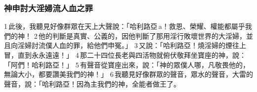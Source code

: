 \subsubsection{神申討大淫婦流人血之罪}

1 此後，我聽見好像群眾在天上大聲說：「哈利路亞 a！救恩、榮耀、權能都屬乎我們的神！ 2 他的判斷是真實、公義的，因他判斷了那用淫行敗壞世界的大淫婦，並且向淫婦討流僕人血的罪，給他們申冤。」 3 又說：「哈利路亞！燒淫婦的煙往上冒，直到永永遠遠！」 4 那二十四位長老與四活物就俯伏敬拜坐寶座的神，說：「阿們！哈利路亞！」 5 有聲音從寶座出來，說：「神的眾僕人哪，凡敬畏他的，無論大小，都要讚美我們的神！」 6 我聽見好像群眾的聲音，眾水的聲音，大雷的聲音，說：「哈利路亞！因為主我們的神，全能者做王了。




























 



















